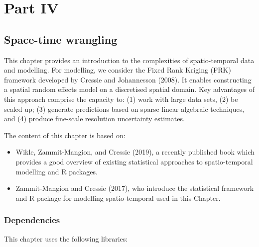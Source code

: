 \documentclass[
  letterpaper,
  krantz2]{style/krantz}
\begin{document}
\part{Part IV}

\hypertarget{space-time-wrangling}{%
\chapter{Space-time wrangling}\label{space-time-wrangling}}

This chapter provides an introduction to the complexities of
spatio-temporal data and modelling. For modelling, we consider the Fixed
Rank Kriging (FRK) framework developed by Cressie and Johannesson
(2008). It enables constructing a spatial random effects model on a
discretised spatial domain. Key advantages of this approach comprise the
capacity to: (1) work with large data sets, (2) be scaled up; (3)
generate predictions based on sparse linear algebraic techniques, and
(4) produce fine-scale resolution uncertainty estimates.

The content of this chapter is based on:

\begin{itemize}
\item
  Wikle, Zammit-Mangion, and Cressie (2019), a recently published book
  which provides a good overview of existing statistical approaches to
  spatio-temporal modelling and R packages.
\item
  Zammit-Mangion and Cressie (2017), who introduce the statistical
  framework and R package for modelling spatio-temporal used in this
  Chapter.
\end{itemize}

\hypertarget{dependencies-8}{%
\section{Dependencies}\label{dependencies-8}}

This chapter uses the following libraries:
\end{document}
